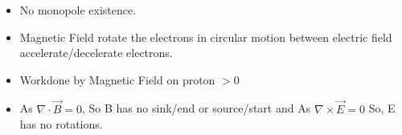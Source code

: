 \documentclass[10pt,landscape]{article}
\begin{document}
\begin{multicols*}{3}
\begin{itemize}
\begin{itemize}
                \item No monopole existence.\
                \item Magnetic Field rotate the electrons in circular motion between electric field accelerate/decelerate electrons.
                \item Workdone by Magnetic Field on proton $> 0$
                \item As $\nabla \cdot \vec{B} = 0$, So B has no sink/end or source/start and As $\nabla \times \vec{E} = 0$ So, E has no rotations.
    \end{itemize}
\end{itemize}

\end{multicols*}
\end{document}
